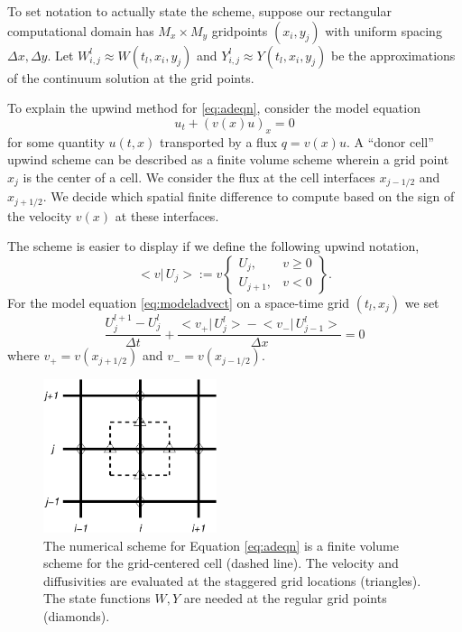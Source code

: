 \documentclass[12pt,final]{amsart}%
\newcommand{\Wlij}{W^l_{i,j}}
\newcommand{\Ylij}{Y^l_{i,j}}
\begin{document}
To set notation to actually state the scheme, suppose our rectangular computational domain has $M_x \times M_y$ gridpoints $(x_i,y_j)$ with uniform spacing $\Delta x,\Delta y$.  Let $\Wlij \approx W(t_l,x_i,y_j)$ and $\Ylij \approx Y(t_l,x_i,y_j)$ be the approximations of the continuum solution at the grid points.

To explain the upwind method for \eqref{eq:adeqn}, consider the model equation
\begin{equation} \label{eq:modeladvect}
u_t + (v(x) u)_x = 0
\end{equation}
for some quantity $u(t,x)$ transported by a flux $q = v(x) u$.  A ``donor cell'' upwind scheme can be described as a finite volume scheme \citep{LeVeque} wherein a grid point $x_j$ is the center of a cell.  We consider the flux at the cell interfaces $x_{j-1/2}$ and $x_{j+1/2}$.  We decide which spatial finite difference to compute based on the sign of the velocity $v(x)$ at these interfaces.

The scheme is easier to display if we define the following upwind notation,
\newcommand{\up}[2]{\big<#1\big|\,#2\big>}
	$$\up{v}{U_j} := v \begin{Bmatrix} U_j, & v \ge 0 \\ U_{j+1}, & v < 0 \end{Bmatrix}.$$
For the model equation \eqref{eq:modeladvect} on a space-time grid $(t_l,x_j)$ we set
\begin{equation}\label{eq:modelfdadvect}
\frac{U_j^{l+1} - U_j^l}{\Delta t} + \frac{\up{v_+}{U_j^l} - \up{v_-}{U_{j-1}^l}}{\Delta x} = 0
\end{equation}
where $v_+ = v(x_{j+1/2})$ and $v_-=v(x_{j-1/2})$.

\begin{figure}[ht]
\centering
\includegraphics[width=2.0in,keepaspectratio=true]{figs/diffstencil}
\bigskip
\caption{The numerical scheme for Equation \eqref{eq:adeqn} is a finite volume scheme for the grid-centered cell (dashed line).  The velocity and diffusivities are evaluated at the staggered grid locations (triangles).  The state functions $W,Y$ are needed at the regular grid points (diamonds).}
\label{fig:stencil}
\end{figure}
\end{document}

